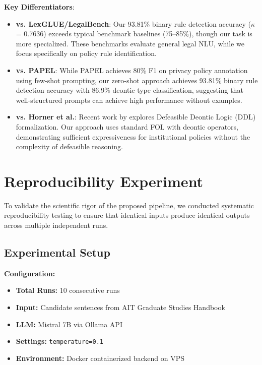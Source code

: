 \textbf{Key Differentiators}:
\begin{itemize}
    \item \textbf{vs. LexGLUE/LegalBench}: Our 93.81\% binary rule detection accuracy ($\kappa$ = 0.7636) exceeds typical benchmark baselines (75--85\%), though our task is more specialized. These benchmarks evaluate general legal NLU, while we focus specifically on policy rule identification.
    
    \item \textbf{vs. PAPEL}: While PAPEL achieves 80\% F1 on privacy policy annotation using few-shot prompting, our zero-shot approach achieves 93.81\% binary rule detection accuracy with 86.9\% deontic type classification, suggesting that well-structured prompts can achieve high performance without examples.
    
    \item \textbf{vs. Horner et al.}: Recent work by \citet{horner2025robust} explores Defeasible Deontic Logic (DDL) formalization. Our approach uses standard FOL with deontic operators, demonstrating sufficient expressiveness for institutional policies without the complexity of defeasible reasoning.
\end{itemize}

\section{Reproducibility Experiment}
\label{sec:reproducibility-experiment}

To validate the scientific rigor of the proposed pipeline, we conducted systematic reproducibility testing to ensure that identical inputs produce identical outputs across multiple independent runs.

\subsection{Experimental Setup}

\textbf{Configuration:}
\begin{itemize}
    \item \textbf{Total Runs:} 10 consecutive runs
    \item \textbf{Input:} Candidate sentences from AIT Graduate Studies Handbook
    \item \textbf{LLM:} Mistral 7B via Ollama API
    \item \textbf{Settings:} \texttt{temperature=0.1}
    \item \textbf{Environment:} Docker containerized backend on VPS
\end{itemize}


